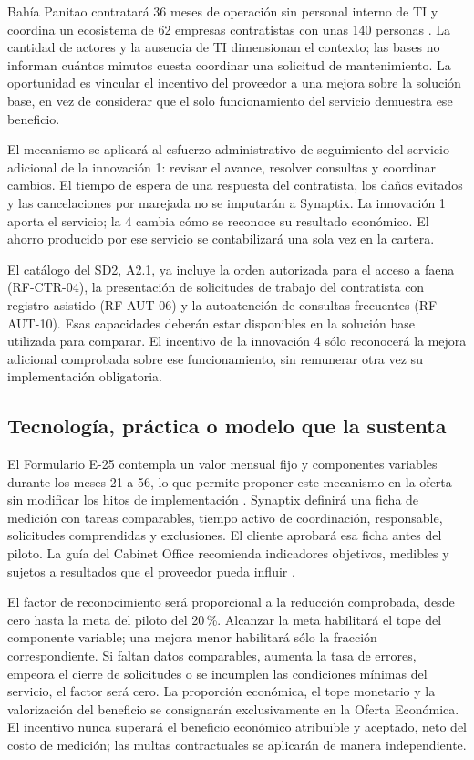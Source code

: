 Bahía Panitao contratará 36 meses de operación sin personal interno de TI y coordina un ecosistema de 62 empresas contratistas con unas 140 personas \parencite[caps.~2, 7 y sec.~9.11]{caso07}. La cantidad de actores y la ausencia de TI dimensionan el contexto; las bases no informan cuántos minutos cuesta coordinar una solicitud de mantenimiento. La oportunidad es vincular el incentivo del proveedor a una mejora sobre la solución base, en vez de considerar que el solo funcionamiento del servicio demuestra ese beneficio.

El mecanismo se aplicará al esfuerzo administrativo de seguimiento del servicio adicional de la innovación 1: revisar el avance, resolver consultas y coordinar cambios. El tiempo de espera de una respuesta del contratista, los daños evitados y las cancelaciones por marejada no se imputarán a Synaptix. La innovación 1 aporta el servicio; la 4 cambia cómo se reconoce su resultado económico. El ahorro producido por ese servicio se contabilizará una sola vez en la cartera.

El catálogo del SD2, A2.1, ya incluye la orden autorizada para el acceso a faena (RF-CTR-04), la presentación de solicitudes de trabajo del contratista con registro asistido (RF-AUT-06) y la autoatención de consultas frecuentes (RF-AUT-10). Esas capacidades deberán estar disponibles en la solución base utilizada para comparar. El incentivo de la innovación 4 sólo reconocerá la mejora adicional comprobada sobre ese funcionamiento, sin remunerar otra vez su implementación obligatoria.

\subsection{Tecnología, práctica o modelo que la sustenta}

El Formulario E-25 contempla un valor mensual fijo y componentes variables durante los meses 21 a 56, lo que permite proponer este mecanismo en la oferta sin modificar los hitos de implementación \parencite[Formulario~E-25, pp.~74--75]{bases-admin}. Synaptix definirá una ficha de medición con tareas comparables, tiempo activo de coordinación, responsable, solicitudes comprendidas y exclusiones. El cliente aprobará esa ficha antes del piloto. La guía del Cabinet Office recomienda indicadores objetivos, medibles y sujetos a resultados que el proveedor pueda influir \parencite[sec.~5.1.5]{uk-outcomes}.

El factor de reconocimiento será proporcional a la reducción comprobada, desde cero hasta la meta del piloto del 20\,\%. Alcanzar la meta habilitará el tope del componente variable; una mejora menor habilitará sólo la fracción correspondiente. Si faltan datos comparables, aumenta la tasa de errores, empeora el cierre de solicitudes o se incumplen las condiciones mínimas del servicio, el factor será cero. La proporción económica, el tope monetario y la valorización del beneficio se consignarán exclusivamente en la Oferta Económica. El incentivo nunca superará el beneficio económico atribuible y aceptado, neto del costo de medición; las multas contractuales se aplicarán de manera independiente.


